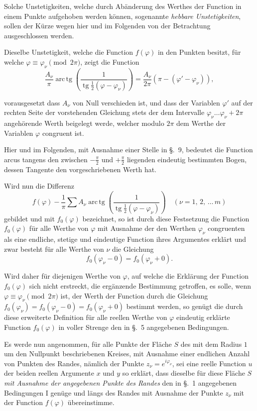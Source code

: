 \documentclass{article}
\begin{document}
Solche Unstetigkeiten, welche durch Abänderung des Werthes der Function in einem Punkte aufgehoben werden können, sogenannte \emph{hebbare Unstetigkeiten}, sollen der Kürze wegen hier und im Folgenden von der Betrachtung ausgeschlossen werden.

Dieselbe Unstetigkeit, welche die Function $f(\varphi)$ in den Punkten besitzt, für welche $\varphi \equiv \varphi_\nu \pmod{2\pi}$, zeigt die Function
\[
\frac{A_\nu}{\pi} \operatorname{arc\,tg}\left(\frac{1}{\operatorname{tg}\frac{1}{2}(\varphi - \varphi_\nu)}\right) = \frac{A_\nu}{2\pi} (\pi - (\varphi' - \varphi_\nu)),
\]

vorausgesetzt dass $A_\nu$ von Null verschieden ist, und dass der Variablen $\varphi'$ auf der rechten Seite der vorstehenden Gleichung stets der dem Intervalle $\varphi_\nu \dots \varphi_\nu + 2\pi$ angehörende Werth beigelegt werde, welcher modulo $2\pi$ dem Werthe der Variablen $\varphi$ congruent ist.

Hier und im Folgenden, mit Ausnahme einer Stelle in §.~9, bedeutet die Function arcus tangens den zwischen $-\frac{\pi}{2}$ und $+\frac{\pi}{2}$ liegenden eindeutig bestimmten Bogen, dessen Tangente den vorgeschriebenen Werth hat.

Wird nun die Differenz
\[
f(\varphi) - \frac{1}{\pi} \sum A_\nu \operatorname{arc\,tg}\left(\frac{1}{\operatorname{tg}\frac{1}{2}(\varphi - \varphi_\nu)}\right) \quad (\nu = 1, \, 2, \, \dots \, m)
\]
gebildet und mit $f_0(\varphi)$ bezeichnet, so ist durch diese Festsetzung die Function $f_0(\varphi)$ für alle Werthe von $\varphi$ mit Ausnahme der den Werthen $\varphi_\nu$ congruenten als eine endliche, stetige und eindeutige Function ihres Argumentes erklärt und zwar besteht für alle Werthe von $\nu$ die Gleichung
\[
f_0(\varphi_\nu - 0) = f_0(\varphi_\nu + 0).
\]

Wird daher für diejenigen Werthe von $\varphi$, auf welche die Erklärung der Function $f_0(\varphi)$ sich nicht erstreckt, die ergänzende Bestimmung getroffen, es solle, wenn $\varphi \equiv \varphi_\nu \pmod{2\pi}$ ist, der Werth der Function durch die Gleichung $f_0(\varphi_\nu) = f_0(\varphi_\nu - 0) = f_0(\varphi_\nu + 0)$ bestimmt werden, so genügt die durch diese erweiterte Definition für alle reellen Werthe von $\varphi$ eindeutig erklärte Function $f_0(\varphi)$ in voller Strenge den in §.~5 angegebenen Bedingungen.

Es werde nun angenommen, für alle Punkte der Fläche $S$ des mit dem Radius $1$ um den Nullpunkt beschriebenen Kreises, mit Ausnahme einer endlichen Anzahl von Punkten des Randes, nämlich der Punkte $z_\nu = e^{i\varphi_\nu}$, sei eine reelle Function $u$ der beiden reellen Argumente $x$ und $y$ so erklärt, dass dieselbe für diese Fläche $S$ \emph{mit Ausnahme der angegebenen Punkte des Randes} den in §.~1 angegebenen Bedingungen I genüge und längs des Randes mit Ausnahme der Punkte $z_\nu$ mit der Function $f(\varphi)$ übereinstimme.
\end{document}

